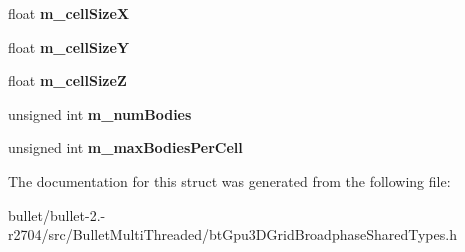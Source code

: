 \begin{DoxyCompactItemize}
\item 
\hypertarget{structbt3_d_grid_broadphase_params_a0603555c0d6b26346bb0e371ecce3b93}{float {\bfseries m\+\_\+cell\+Size\+X}}\label{structbt3_d_grid_broadphase_params_a0603555c0d6b26346bb0e371ecce3b93}

\item 
\hypertarget{structbt3_d_grid_broadphase_params_ab48bba603a0cc56d190128d27bcd01a2}{float {\bfseries m\+\_\+cell\+Size\+Y}}\label{structbt3_d_grid_broadphase_params_ab48bba603a0cc56d190128d27bcd01a2}

\item 
\hypertarget{structbt3_d_grid_broadphase_params_af1a524b2027c4dacbd9d9f5f6afff98e}{float {\bfseries m\+\_\+cell\+Size\+Z}}\label{structbt3_d_grid_broadphase_params_af1a524b2027c4dacbd9d9f5f6afff98e}

\item 
\hypertarget{structbt3_d_grid_broadphase_params_acd87c913a6bff9974e82b0df284229e8}{unsigned int {\bfseries m\+\_\+num\+Bodies}}\label{structbt3_d_grid_broadphase_params_acd87c913a6bff9974e82b0df284229e8}

\item 
\hypertarget{structbt3_d_grid_broadphase_params_aa78e26bf160c67798ffb9c73995337d2}{unsigned int {\bfseries m\+\_\+max\+Bodies\+Per\+Cell}}\label{structbt3_d_grid_broadphase_params_aa78e26bf160c67798ffb9c73995337d2}

\end{DoxyCompactItemize}


The documentation for this struct was generated from the following file\+:\begin{DoxyCompactItemize}
\item 
bullet/bullet-\/2.-\/r2704/src/\+Bullet\+Multi\+Threaded/bt\+Gpu3\+D\+Grid\+Broadphase\+Shared\+Types.\+h\end{DoxyCompactItemize}
